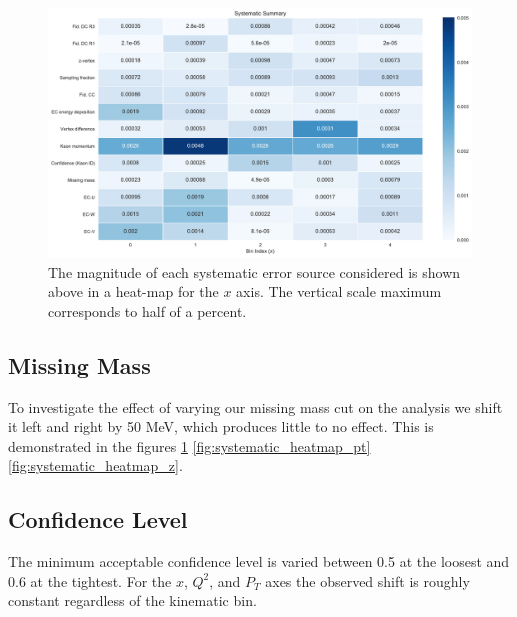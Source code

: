 \begin{figure}
	\label{fig:systematic_heatmap_x}
	\begin{center}
		\includegraphics[width=\textwidth]{image/plots/kaon-bsa/systematics_integrated_heatmap_x.pdf}
		\caption{The magnitude of each systematic error source considered is shown above in a heat-map for the $x$ axis.  The vertical scale maximum corresponds to half of a percent.}
	\end{center}
\end{figure}

\subsection{Missing Mass}
To investigate the effect of varying our missing mass cut on the analysis we shift it left and right by 50 MeV, which produces little to no effect.  This is demonstrated in the figures \ref{fig:systematic_heatmap_x} \ref{fig:systematic_heatmap_pt} \ref{fig:systematic_heatmap_z}.  

\subsection{Confidence Level}
The minimum acceptable confidence level is varied between 0.5 at the loosest and 0.6 at the tightest.  For the $x$, $Q^2$, and $P_T$ axes the observed shift is roughly constant regardless of the kinematic bin.  

